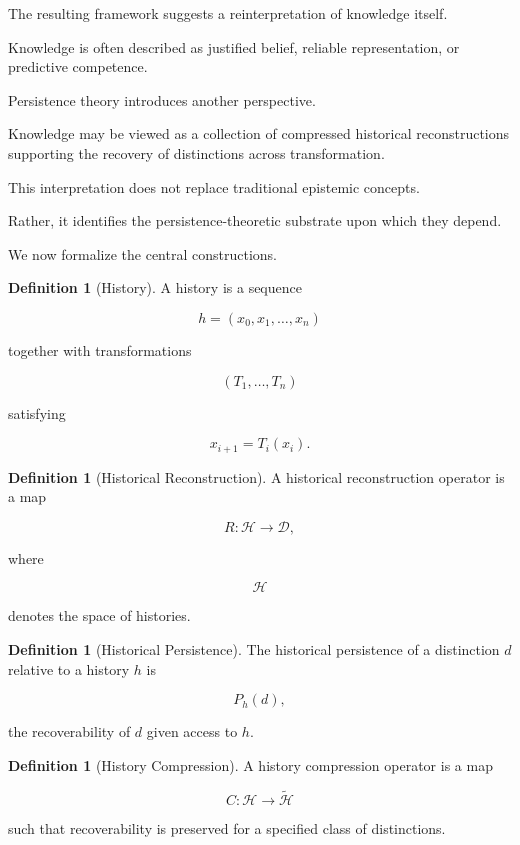 \documentclass[12pt,oneside]{article}
\theoremstyle{definition}
\newtheorem{definition}[theorem]{Definition} \newtheorem{axiom}[theorem]{Axiom} \newtheorem{remark}[theorem]{Remark} \newtheorem{example}[theorem]{Example}
\begin{document}
The resulting framework suggests a reinterpretation of knowledge itself.

Knowledge is often described as justified belief, reliable representation, or predictive competence.

Persistence theory introduces another perspective.

Knowledge may be viewed as a collection of compressed historical reconstructions supporting the recovery of distinctions across transformation.

This interpretation does not replace traditional epistemic concepts.

Rather, it identifies the persistence-theoretic substrate upon which they depend.

We now formalize the central constructions.

\begin{definition}[History]

A history is a sequence

\[
h
=
(x_0,x_1,\ldots,x_n)
\]

together with transformations

\[
(T_1,\ldots,T_n)
\]

satisfying

\[
x_{i+1}
=
T_i(x_i).
\]

\end{definition}

\begin{definition}[Historical Reconstruction]

A historical reconstruction operator is a map

\[
R:\mathcal H
\rightarrow
\mathcal D,
\]

where

\[
\mathcal H
\]

denotes the space of histories.

\end{definition}

\begin{definition}[Historical Persistence]

The historical persistence of a distinction \(d\) relative to a history \(h\) is

\[
P_h(d),
\]

the recoverability of \(d\) given access to \(h\).

\end{definition}

\begin{definition}[History Compression]

A history compression operator is a map

\[
C:\mathcal H
\rightarrow
\widetilde{\mathcal H}
\]

such that recoverability is preserved for a specified class of distinctions.

\end{definition}
\end{document}
